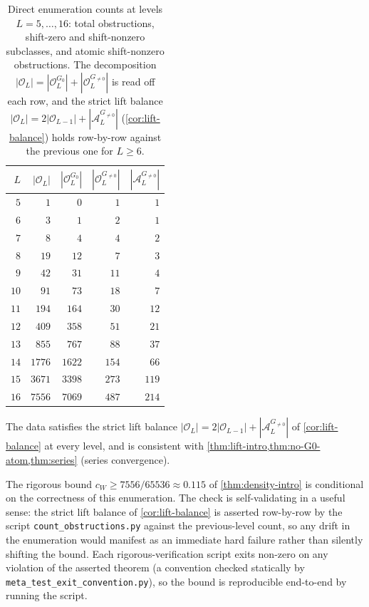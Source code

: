 \documentclass[11pt,reqno]{amsart}
\newcommand{\Obs}{\mathcal{O}}
\newcommand{\Atom}{\mathcal{A}}
\begin{document}
\begin{table}[ht]
\centering
\begin{tabular}{rrrrr}
\toprule
$L$ & $|\Obs_L|$ & $|\Obs_L^{G_0}|$ & $|\Obs_L^{G_{\ne 0}}|$ & $|\Atom_L^{G_{\ne 0}}|$ \\
\midrule
$5$  & $1$    & $0$    & $1$   & $1$   \\
$6$  & $3$    & $1$    & $2$   & $1$   \\
$7$  & $8$    & $4$    & $4$   & $2$   \\
$8$  & $19$   & $12$   & $7$   & $3$   \\
$9$  & $42$   & $31$   & $11$  & $4$   \\
$10$ & $91$   & $73$   & $18$  & $7$   \\
$11$ & $194$  & $164$  & $30$  & $12$  \\
$12$ & $409$  & $358$  & $51$  & $21$  \\
$13$ & $855$  & $767$  & $88$  & $37$  \\
$14$ & $1776$ & $1622$ & $154$ & $66$  \\
$15$ & $3671$ & $3398$ & $273$ & $119$ \\
$16$ & $7556$ & $7069$ & $487$ & $214$ \\
\bottomrule
\end{tabular}
\caption{Direct enumeration counts at levels $L=5,\dots,16$: total obstructions, shift-zero and shift-nonzero subclasses, and atomic shift-nonzero obstructions. The decomposition $|\Obs_L| = |\Obs_L^{G_0}| + |\Obs_L^{G_{\ne 0}}|$ is read off each row, and the strict lift balance $|\Obs_L| = 2|\Obs_{L-1}| + |\Atom_L^{G_{\ne 0}}|$ (\cref{cor:lift-balance}) holds row-by-row against the previous one for $L \ge 6$.}
\label{tab:appendix-counts}
\end{table}

The data satisfies the strict lift balance $|\Obs_L| = 2 |\Obs_{L-1}| + |\Atom_L^{G_{\ne 0}}|$
of \cref{cor:lift-balance} at every level, and is consistent with
\cref{thm:lift-intro,thm:no-G0-atom,thm:series}
(series convergence).

The rigorous bound $c_W \ge 7556/65536 \approx 0.115$ of
\cref{thm:density-intro} is conditional on the correctness of this
enumeration. The check is self-validating in a useful sense: the
strict lift balance of \cref{cor:lift-balance} is asserted
row-by-row by the script \texttt{count\_obstructions.py} against the
previous-level count, so any drift in the enumeration would manifest as
an immediate hard failure rather than silently shifting the bound.
Each rigorous-verification script exits non-zero on any violation of
the asserted theorem (a convention checked statically by
\texttt{meta\_test\_exit\_convention.py}), so the bound is reproducible
end-to-end by running the script.
\end{document}
